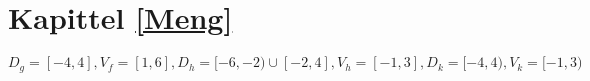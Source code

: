 




\section*{Kapittel \ref{Meng}}

$D_g=[-4, 4], V_f=[1, 6], D_h=[-6, -2)\cup[-2, 4], V_h=[-1, 3], D_k=[-4, 4), V_k=[-1, 3)$




